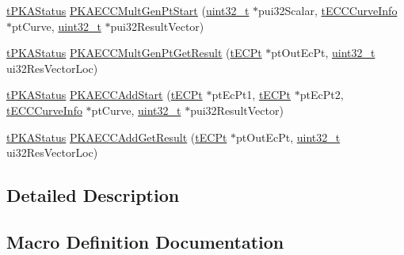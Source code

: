 \begin{DoxyCompactItemize}
\item 
\hyperlink{pka_8h_a94af1eb5fa0257508f865b5e40de4ed3}{t\+P\+K\+A\+Status} \hyperlink{group__pka__driver_ga37519c82259a12764cb68cb265bc09c9}{P\+K\+A\+E\+C\+C\+Mult\+Gen\+Pt\+Start} (\hyperlink{_p_e___types_8h_a33594304e786b158f3fb30289278f5af}{uint32\+\_\+t} $\ast$pui32\+Scalar, \hyperlink{ecc__curveinfo_8h_a17a628519ae5ba49f5cf62decade4dcb}{t\+E\+C\+C\+Curve\+Info} $\ast$pt\+Curve, \hyperlink{_p_e___types_8h_a33594304e786b158f3fb30289278f5af}{uint32\+\_\+t} $\ast$pui32\+Result\+Vector)
\item 
\hyperlink{pka_8h_a94af1eb5fa0257508f865b5e40de4ed3}{t\+P\+K\+A\+Status} \hyperlink{group__pka__driver_ga5fe2796e884a65a75bb1732831e0bca9}{P\+K\+A\+E\+C\+C\+Mult\+Gen\+Pt\+Get\+Result} (\hyperlink{pka_8h_ad8a0d9ffc3dc89cecf35c8fac620a030}{t\+E\+C\+Pt} $\ast$pt\+Out\+Ec\+Pt, \hyperlink{_p_e___types_8h_a33594304e786b158f3fb30289278f5af}{uint32\+\_\+t} ui32\+Res\+Vector\+Loc)
\item 
\hyperlink{pka_8h_a94af1eb5fa0257508f865b5e40de4ed3}{t\+P\+K\+A\+Status} \hyperlink{group__pka__driver_gab12f37d870c923e7800d0523c40442a6}{P\+K\+A\+E\+C\+C\+Add\+Start} (\hyperlink{pka_8h_ad8a0d9ffc3dc89cecf35c8fac620a030}{t\+E\+C\+Pt} $\ast$pt\+Ec\+Pt1, \hyperlink{pka_8h_ad8a0d9ffc3dc89cecf35c8fac620a030}{t\+E\+C\+Pt} $\ast$pt\+Ec\+Pt2, \hyperlink{ecc__curveinfo_8h_a17a628519ae5ba49f5cf62decade4dcb}{t\+E\+C\+C\+Curve\+Info} $\ast$pt\+Curve, \hyperlink{_p_e___types_8h_a33594304e786b158f3fb30289278f5af}{uint32\+\_\+t} $\ast$pui32\+Result\+Vector)
\item 
\hyperlink{pka_8h_a94af1eb5fa0257508f865b5e40de4ed3}{t\+P\+K\+A\+Status} \hyperlink{group__pka__driver_ga4fe3c47d5600bd8e8b073a19ec96d258}{P\+K\+A\+E\+C\+C\+Add\+Get\+Result} (\hyperlink{pka_8h_ad8a0d9ffc3dc89cecf35c8fac620a030}{t\+E\+C\+Pt} $\ast$pt\+Out\+Ec\+Pt, \hyperlink{_p_e___types_8h_a33594304e786b158f3fb30289278f5af}{uint32\+\_\+t} ui32\+Res\+Vector\+Loc)
\end{DoxyCompactItemize}


\subsection{Detailed Description}


\subsection{Macro Definition Documentation}
